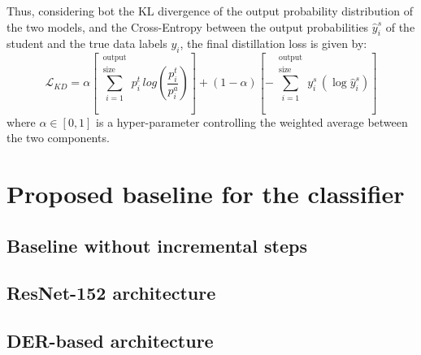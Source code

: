 Thus, considering bot the KL divergence of the output probability distribution of the two models, and the Cross-Entropy between the output probabilities $\hat{y}_i^s$ of the student and the true data labels $y_i$, the final distillation loss is given by:
\begin{equation}
    \mathcal{L}_{KD} = \alpha \left[\sum_{i=1}^{\substack{\text{output}\\\text{size}}} p_i^t \, log \left( \frac{p_i^t}{p_i^a} \right) \right]
    + (1-\alpha) \left[-\sum_{i=1}^{\substack{\text{output}\\\text{size}}} y_i^s \, (\log \hat{y}_i^s) \right]
\end{equation}
where $\alpha \in [0, 1]$ is a hyper-parameter controlling the weighted average between the two components.

\section{Proposed baseline for the classifier}
\label{sec:method-baseline}
\subsection{Baseline without incremental steps}
\subsection{ResNet-152 architecture}
\subsection{DER-based architecture}